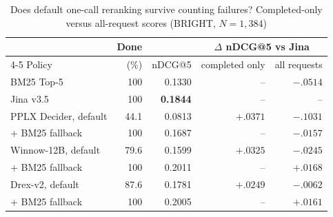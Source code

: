\begin{table}[t]
\centering
\caption{Does default one-call reranking survive counting failures? Completed-only versus all-request scores (BRIGHT, $N=1{,}384$)}\label{tab:original}
\scriptsize\setlength{\tabcolsep}{3pt}
\begin{tabular}{@{}lrrrr@{}}\toprule
 & Done & & \multicolumn{2}{c}{$\Delta$ nDCG@5 vs Jina}\\\cmidrule(l){4-5}
Policy & (\%) & nDCG@5 & completed only & all requests\\
\midrule
BM25 Top-5 & 100 & 0.1330 & -- & $-.0514$\\
Jina v3.5 & 100 & \textbf{0.1844} & -- & --\\
PPLX Decider, default & 44.1 & 0.0813 & $\mathbf{+.0371}$ & $\mathbf{-.1031}$\\
\quad + BM25 fallback & 100 & 0.1687 & -- & $-.0157$\\
Winnow-12B, default & 79.6 & 0.1599 & $+.0325$ & $-.0245$\\
\quad + BM25 fallback & 100 & 0.2011 & -- & $+.0168$\\
Drex-v2, default & 87.6 & 0.1781 & $+.0249$ & $-.0062$\\
\quad + BM25 fallback & 100 & 0.2005 & -- & $+.0161$\\
\bottomrule\end{tabular}
\end{table}
